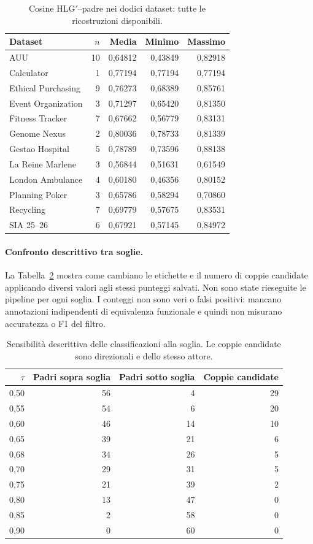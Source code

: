 \begin{table}[htbp]
\centering
\small
\caption{Cosine HLG$\prime$--padre nei dodici dataset: tutte le ricostruzioni disponibili.}
\label{tab:cosine-tuning-datasets}
\begin{tabular}{lrrrr}
\toprule
Dataset & $n$ & Media & Minimo & Massimo \\
\midrule
AUU & 10 & 0,64812 & 0,43849 & 0,82918 \\
Calculator & 1 & 0,77194 & 0,77194 & 0,77194 \\
Ethical Purchasing & 9 & 0,76273 & 0,68389 & 0,85761 \\
Event Organization & 3 & 0,71297 & 0,65420 & 0,81350 \\
Fitness Tracker & 7 & 0,67662 & 0,56779 & 0,83131 \\
Genome Nexus & 2 & 0,80036 & 0,78733 & 0,81339 \\
Gestao Hospital & 5 & 0,78789 & 0,73596 & 0,88138 \\
La Reine Marlene & 3 & 0,56844 & 0,51631 & 0,61549 \\
London Ambulance & 4 & 0,60180 & 0,46356 & 0,80152 \\
Planning Poker & 3 & 0,65786 & 0,58294 & 0,70860 \\
Recycling & 7 & 0,69779 & 0,57675 & 0,83531 \\
SIA 25--26 & 6 & 0,67921 & 0,57145 & 0,84972 \\
\bottomrule
\end{tabular}
\end{table}
\paragraph{Confronto descrittivo tra soglie.}
La Tabella~\ref{tab:cosine-threshold-sensitivity} mostra come cambiano le
etichette e il numero di coppie candidate applicando diversi valori agli
stessi punteggi salvati. Non sono state rieseguite le pipeline per ogni soglia.
I conteggi non sono veri o falsi positivi: mancano annotazioni indipendenti
di equivalenza funzionale e quindi non misurano accuratezza o F1 del filtro.
\begin{table}[htbp]
\centering
\small
\caption{Sensibilità descrittiva delle classificazioni alla soglia. Le coppie candidate sono direzionali e dello stesso attore.}
\label{tab:cosine-threshold-sensitivity}
\begin{tabular}{rrrr}
\toprule
$\tau$ & Padri sopra soglia & Padri sotto soglia & Coppie candidate \\
\midrule
0,50 & 56 & 4 & 29 \\
0,55 & 54 & 6 & 20 \\
0,60 & 46 & 14 & 10 \\
0,65 & 39 & 21 & 6 \\
0,68 & 34 & 26 & 5 \\
0,70 & 29 & 31 & 5 \\
0,75 & 21 & 39 & 2 \\
0,80 & 13 & 47 & 0 \\
0,85 & 2 & 58 & 0 \\
0,90 & 0 & 60 & 0 \\
\bottomrule
\end{tabular}
\end{table}
